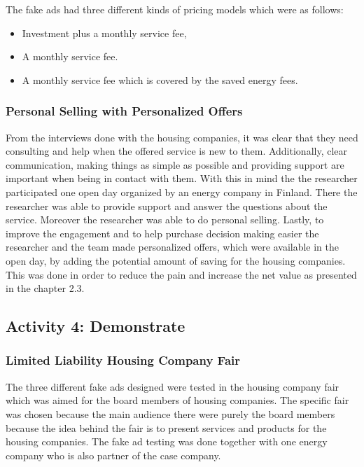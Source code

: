 The fake ads had three different kinds of pricing models which were as follows:
\begin{itemize}
	\setlength{\itemsep}{2pt}
	\item Investment plus a monthly service fee,
	\item A monthly service fee.
	\item A monthly service fee which is covered by the saved energy fees.
\end{itemize}

\subsubsection*{Personal Selling with Personalized Offers}

From the interviews done with the housing companies, it was clear that they need consulting and help when the offered service is new to them. Additionally, clear communication, making things as simple as possible and providing support are important when being in contact with them. With this in mind the the researcher participated one open day organized by an energy company in Finland. There the researcher was able to provide support and answer the questions about the service. Moreover the researcher was able to do personal selling. Lastly, to improve the engagement and to help purchase decision making easier the researcher and the team made personalized offers, which were available in the open day, by adding the potential amount of saving for the housing companies. This was done in order to reduce the pain and increase the net value as presented in the chapter 2.3.

\subsection{Activity 4: Demonstrate}

\subsubsection*{Limited Liability Housing Company Fair}
The three different fake ads designed were tested in the housing company fair which was aimed for the board members of housing companies. The specific fair was chosen because the main audience there were purely the board members because the idea behind the fair is to present services and products for the housing companies. The fake ad testing was done together with one energy company who is also partner of the case company.

